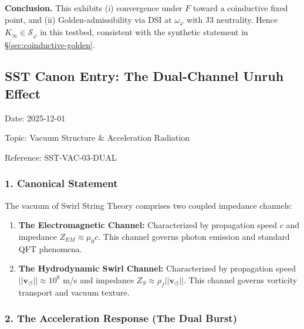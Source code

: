 \documentclass[10pt,reprint,aps,onecolumn,nofootinbib]{revtex4-2}
\begin{document}
            \medskip
            \noindent
            \textbf{Conclusion.}
            This exhibits (i) convergence under \(F\) toward a coinductive fixed point, and
            (ii) Golden-admissibility via DSI at \(\omega_\varphi\) with J3 neutrality.
            Hence \(K_\infty\in\mathcal S_\varphi\) in this testbed, consistent with the
            synthetic statement in \S\ref{sec:coinductive-golden}.



        \subsection*{\textbf{SST Canon Entry: The Dual-Channel Unruh Effect}}


            Date: 2025-12-01

            Topic: Vacuum Structure & Acceleration Radiation

            Reference: SST-VAC-03-DUAL



            \subsubsection*{\textbf{1. Canonical Statement}}


                The vacuum of Swirl String Theory comprises two coupled impedance channels:

                \begin{enumerate}
                        \item \textbf{The Electromagnetic Channel:} Characterized by propagation speed $c$ and impedance $Z_{EM} \approx \mu_0 c$. This channel governs photon emission and standard QFT phenomena.


                        \item \textbf{The Hydrodynamic Swirl Channel:} Characterized by propagation speed $||\mathbf{v}_{\circlearrowleft}|| \approx 10^6$ m/s and impedance $Z_S \approx \rho_{\!f} ||\mathbf{v}_{\circlearrowleft}||$. This channel governs vorticity transport and vacuum texture.


                \end{enumerate}


            \subsubsection*{\textbf{2. The Acceleration Response (The Dual Burst)}}
\end{document}
